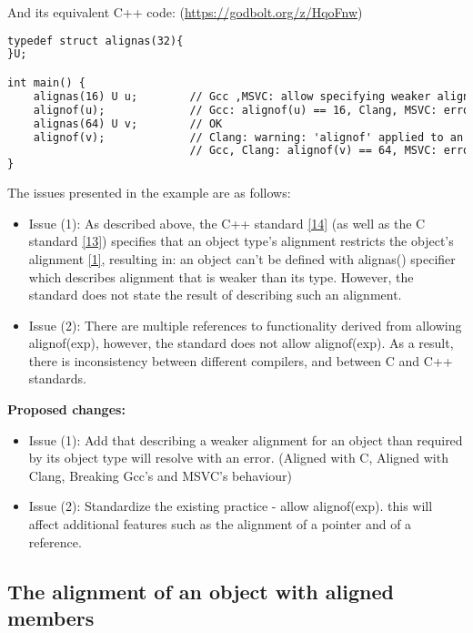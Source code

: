 \documentclass[11pt]{article}
\begin{document}
And its equivalent C++ code: (\url{https://godbolt.org/z/HqoFnw})

\begin{lstlisting}[language=diff]
typedef struct alignas(32){
}U; 

int main() {
    alignas(16) U u;        // Gcc ,MSVC: allow specifying weaker alignment than of type, Clang: error. (1)
    alignof(u);             // Gcc: alignof(u) == 16, Clang, MSVC: error
    alignas(64) U v;        // OK
    alignof(v);             // Clang: warning: 'alignof' applied to an expression is a GNU extension.
                            // Gcc, Clang: alignof(v) == 64, MSVC: error. (2)
}
\end{lstlisting}
The issues presented in the example are as follows:
\begin{itemize}

    \item Issue (1): As described above, the C++ standard \hyperlink{CppStandard}{[14]} (as well as the C standard \hyperlink{CStandard}{[13]}) specifies that an object type's alignment restricts the object's alignment \hyperlink{6.7.6/1}{[1]},  resulting in: an object can't be defined with alignas() specifier which describes alignment that is weaker than its type. 
    However, the standard does not state the result of describing such an alignment.
    \item Issue (2): There are multiple references to functionality derived from allowing alignof(exp), however, the standard does not allow alignof(exp). As a result, there is inconsistency between different compilers, and between C and C++ standards.
\end{itemize}
\textbf{Proposed changes:} 

\begin{itemize}
    \item Issue (1): Add that describing a weaker alignment for an object than required by its object type will resolve with an error. (Aligned with C, Aligned with Clang, Breaking Gcc's and MSVC's behaviour)
    
    \item Issue (2): Standardize the existing practice - allow alignof(exp). this will affect additional features such as the alignment of a pointer and of a reference.
    
\end{itemize}

\subsection{The alignment of an object with aligned members}
\end{document}

